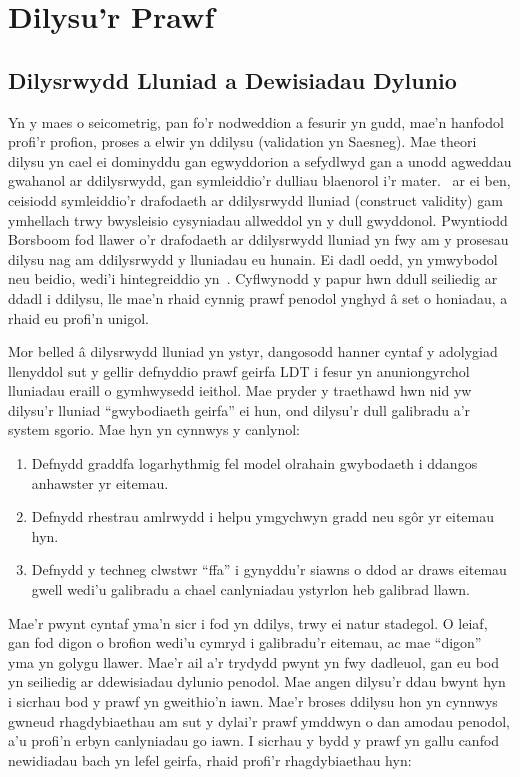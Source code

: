 \section{Dilysu'r Prawf}
\subsection{Dilysrwydd Lluniad a Dewisiadau Dylunio}
Yn y maes o seicometrig, pan fo'r nodweddion a fesurir yn gudd, mae'n hanfodol profi'r profion, proses a elwir yn ddilysu (validation yn Saesneg). Mae theori dilysu yn cael ei dominyddu gan egwyddorion a sefydlwyd gan \textcite{messick_validity_1987} a unodd agweddau gwahanol ar ddilysrwydd, gan symleiddio'r dulliau blaenorol i'r mater.\ \textcite{borsboom_concept_2004} ar ei ben, ceisiodd symleiddio'r drafodaeth ar ddilysrwydd lluniad (construct validity) gam ymhellach trwy bwysleisio cysyniadau allweddol yn y dull gwyddonol. Pwyntiodd Borsboom fod llawer o'r drafodaeth ar ddilysrwydd lluniad yn fwy am y prosesau dilysu nag am ddilysrwydd y lluniadau eu hunain. Ei dadl oedd, yn ymwybodol neu beidio, wedi'i hintegreiddio yn~\cite{kane_validating_2013}. Cyflwynodd y papur hwn ddull seiliedig ar ddadl i ddilysu, lle mae'n rhaid cynnig prawf penodol ynghyd â set o honiadau, a rhaid eu profi'n unigol.

Mor belled â dilysrwydd lluniad yn ystyr, dangosodd hanner cyntaf y adolygiad llenyddol sut y gellir defnyddio prawf geirfa LDT i fesur yn anuniongyrchol lluniadau eraill o gymhwysedd ieithol. Mae pryder y traethawd hwn nid yw dilysu'r lluniad ``gwybodiaeth geirfa'' ei hun, ond dilysu'r dull galibradu a'r system sgorio. Mae hyn yn cynnwys y canlynol:

\begin{enumerate}
  \item Defnydd graddfa logarhythmig fel model olrahain gwybodaeth i ddangos anhawster yr eitemau.
  \item Defnydd rhestrau amlrwydd i helpu ymgychwyn gradd neu sgôr yr eitemau hyn.
  \item Defnydd y techneg clwstwr ``ffa'' i gynyddu'r siawns o ddod ar draws eitemau gwell wedi'u galibradu a chael canlyniadau ystyrlon heb galibrad llawn.
\end{enumerate}

Mae'r pwynt cyntaf yma'n sicr i fod yn ddilys, trwy ei natur stadegol. O leiaf, gan fod digon o brofion wedi'u cymryd i galibradu'r eitemau, ac mae ``digon'' yma yn golygu llawer. Mae'r ail a'r trydydd pwynt yn fwy dadleuol, gan eu bod yn seiliedig ar ddewisiadau dylunio penodol. Mae angen dilysu'r ddau bwynt hyn i sicrhau bod y prawf yn gweithio'n iawn. Mae'r broses ddilysu hon yn cynnwys gwneud rhagdybiaethau am sut y dylai'r prawf ymddwyn o dan amodau penodol, a'u profi'n erbyn canlyniadau go iawn. I sicrhau y bydd y prawf yn gallu canfod newidiadau bach yn lefel geirfa, rhaid profi'r rhagdybiaethau hyn:


